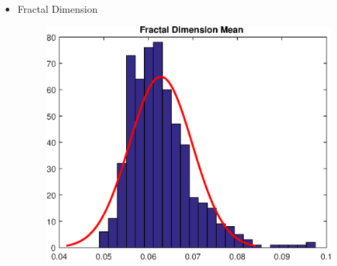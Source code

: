 \documentclass[11pt,a4paper]{article}
\numberwithin{equation}{section}
\begin{document}
\begin{itemize}
\item Fractal Dimension
\begin{figure}[H]
\centering
  \includegraphics[width=.5\linewidth]{./img/fractal_dimension_mean}
  \label{fig:test1}
\end{figure}%


\end{itemize}
\end{document}
